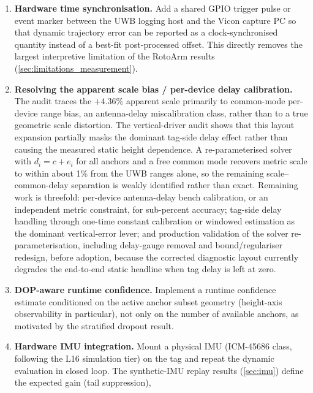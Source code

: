 \documentclass[11pt,a4paper]{article}
\begin{document}
\begin{enumerate}
  \item \textbf{Hardware time synchronisation.} Add a shared GPIO trigger
        pulse or event marker between the UWB logging host and the Vicon
        capture PC so that dynamic trajectory error can be reported as a
        clock-synchronised quantity instead of a best-fit post-processed
        offset. This directly removes the largest interpretive limitation
        of the RotoArm results (\cref{sec:limitations_measurement}).
  \item \textbf{Resolving the apparent scale bias / per-device delay calibration.}
        The audit traces the $+4.36\%$ apparent scale primarily to
        common-mode per-device range bias, an antenna-delay
        miscalibration class, rather than to a true geometric scale
        distortion. The vertical-driver audit shows that this layout
        expansion partially masks the dominant tag-side delay effect rather
        than causing the measured static height dependence. A
        re-parameterised solver with $d_i=c+e_i$ for all
        anchors and a free common mode recovers metric scale to within
        about 1\% from the UWB ranges alone, so the remaining
        scale--common-delay separation is weakly identified rather than
        exact. Remaining work is
        threefold: per-device antenna-delay bench calibration, or an
        independent metric constraint, for sub-percent accuracy;
        tag-side delay handling through one-time constant calibration or
        windowed estimation as the dominant vertical-error lever; and
        production validation of the solver
        re-parameterisation, including delay-gauge removal and
        bound/regulariser redesign, before adoption, because the
        corrected diagnostic layout currently degrades the end-to-end
        static headline when tag delay is left at zero.
  \item \textbf{DOP-aware runtime confidence.} Implement a runtime
        confidence estimate conditioned on the active anchor subset
        geometry (height-axis observability in particular), not only on
        the number of available anchors, as motivated by the stratified
        dropout result.
  \item \textbf{Hardware IMU integration.} Mount a physical IMU
        (ICM-45686 class, following the L16 simulation tier) on the tag
        and repeat the dynamic evaluation in closed loop. The
        synthetic-IMU replay results (\cref{sec:imu}) define the expected gain (tail suppression),

\end{enumerate}
\end{document}

